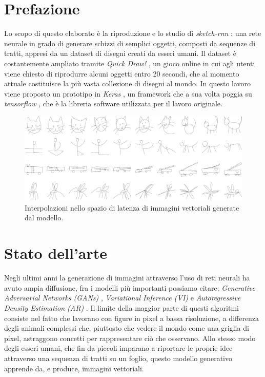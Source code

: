 \section{Prefazione}
\label{sec:prefazione}
Lo scopo di questo elaborato è la riproduzione e lo studio di \textit{sketch-rnn} \cite{sketchrnn}: una rete neurale in grado di generare schizzi di semplici oggetti, composti da sequenze di tratti, appresi da un dataset di disegni creati da esseri umani. Il dataset è costantemente ampliato tramite \textit{Quick Draw!} \cite{quickdraw}, un gioco online in cui agli utenti viene chiesto di riprodurre alcuni oggetti entro 20 secondi, che al momento attuale costituisce la più vasta collezione di disegni al mondo. In questo lavoro viene proposto un prototipo in \textit{Keras} \cite{keras}, un framework che a sua volta poggia su \textit{tensorflow} \cite{tensorflow}, che è la libreria software utilizzata per il lavoro originale.
\begin{figure}[ht]
	\centering
	\includegraphics[width=\linewidth]{img/sketch_rnn_latent.png}
	\caption{Interpolazioni nello spazio di latenza di immagini vettoriali generate dal modello.}
	\label{fig:1.1}
\end{figure}
\section{Stato dell'arte}
Negli ultimi anni la generazione di immagini attraverso l'uso di reti neurali ha avuto ampia diffusione, fra i modelli più importanti possiamo citare: \textit{Generative Adversarial Networks (GANs)} \cite{GAN}, \textit{Variational Inference (VI)} \cite{VI} e \textit{Autoregressive Density Estimation (AR)} \cite{AR}. Il limite della maggior parte di questi algoritmi consiste nel fatto che lavorano con figure in pixel a bassa risoluzione, a differenza degli animali complessi che, piuttosto che vedere il mondo come una griglia di pixel, astraggono concetti per rappresentare ciò che osservano. Allo stesso modo degli esseri umani, che fin da piccoli imparano a riportare le proprie idee attraverso una sequenza di tratti su un foglio, questo modello generativo apprende da, e produce, immagini vettoriali.

